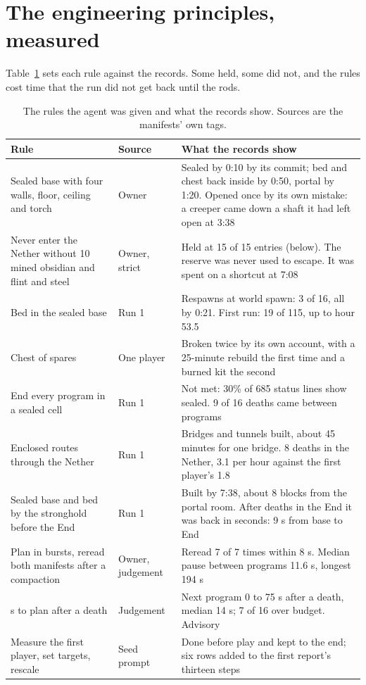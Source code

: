 \documentclass[11pt,a4paper]{article}
\begin{document}
\section{The engineering principles, measured}
\label{sec:principles}

Table~\ref{tab:principles} sets each rule against the records. Some held, some did not, and the rules cost time that the run did not get back until the rods.

\begin{table}[t]
  \caption{The rules the agent was given and what the records show. Sources are the manifests' own tags.}
  \label{tab:principles}
  \small
  \begin{tabularx}{\textwidth}{@{}>{\raggedright\arraybackslash}p{4.3cm}>{\raggedright\arraybackslash}p{1.75cm}X@{}}
    \toprule
    \textbf{Rule} & \textbf{Source} & \textbf{What the records show} \\
    \midrule
    Sealed base with four walls, floor, ceiling and torch & Owner & Sealed by 0:10 by its commit; bed and chest back inside by 0:50, portal by 1:20. Opened once by its own mistake: a creeper came down a shaft it had left open at 3:38 \\
    Never enter the Nether without 10 mined obsidian and flint and steel & Owner, strict & Held at 15 of 15 entries (below). The reserve was never used to escape. It was spent on a shortcut at 7:08 \\
    Bed in the sealed base & Run 1 & Respawns at world spawn: 3 of 16, all by 0:21. First run: 19 of 115, up to hour 53.5 \\
    Chest of spares & One player & Broken twice by its own account, with a 25-minute rebuild the first time and a burned kit the second \\
    End every program in a sealed cell & Run 1 & Not met: 30\% of 685 status lines show sealed. 9 of 16 deaths came between programs \\
    Enclosed routes through the Nether & Run 1 & Bridges and tunnels built, about 45 minutes for one bridge. 8 deaths in the Nether, 3.1 per hour against the first player's 1.8 \\
    Sealed base and bed by the stronghold before the End & Run 1 & Built by 7:38, about 8 blocks from the portal room. After deaths in the End it was back in seconds: 9 s from base to End \\
    Plan in bursts, reread both manifests after a compaction & Owner, judgement & Reread 7 of 7 times within 8 s. Median pause between programs 11.6 s, longest 194 s \\
    30 s to plan after a death & Judgement & Next program 0 to 75 s after a death, median 14 s; 7 of 16 over budget. Advisory \\
    Measure the first player, set targets, rescale & Seed prompt & Done before play and kept to the end; six rows added to the first report's thirteen steps \\
    \bottomrule
  \end{tabularx}
\end{table}
\end{document}
